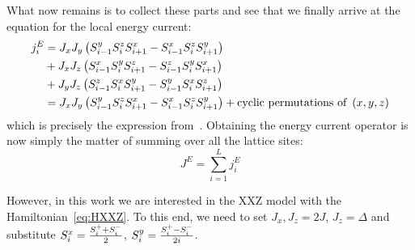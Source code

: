 What now remains is to collect these parts and see that we finally arrive at the equation for the local energy current:
\begin{align}
    j_i^E &= J_x J_y \left(S^{y}_{i-1}S^{z}_i S^{x}_{i+1} - S^{x}_{i-1}S^{z}_{i}S^{y}_{i+1}\right) \nonumber\\
    &+ J_x J_z \left(S^{x}_{i-1}S^{y}_i S^{z}_{i+1} - S^{z}_{i-1}S^{y}_{i}S^{x}_{i+1}\right) \nonumber \\
    &+ J_y J_z \left(S^{z}_{i-1}S^{x}_i S^{y}_{i+1} - S^{y}_{i-1}S^{x}_{i}S^{z}_{i+1}\right) \nonumber \\
    &= J_x J_y \left(S^{y}_{i-1}S^{z}_i S^{x}_{i+1} - S^{x}_{i-1}S^{z}_{i}S^{y}_{i+1}\right) + \text{cyclic permutations of } \left(x,y,z\right)
    \label{eq:local energy current}
\end{align}
which is precisely the expression from~\textcite{Zotos1997}. Obtaining the energy current operator is now simply the matter of summing over all the lattice sites:
\begin{equation}
    J^E = \sum_{i=1}^L j_i^E
    \label{eq:energy current}
\end{equation}

However, in this work we are interested in the XXZ model with the Hamiltonian~\eqref{eq:HXXZ}. To this end,
we need to set \(J_x, J_z = 2J\), \(J_z = \Delta\) and substitute \(S^{x}_i = \frac{S^{+}_i + S^{-}_i}{2}\), \(S^{y}_i = \frac{S^{+}_i-S^{-}_i}{2i}\).